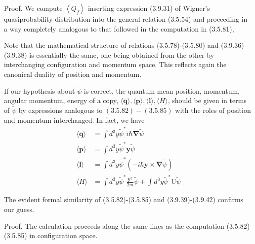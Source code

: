 \documentclass{article}
\begin{document}
Proof. We compute $\left\langle Q_{f}\right\rangle$ inserting expression (3.9.31) of Wigner's quasiprobability distribution into the general relation (3.5.54) and proceeding in a way completely analogous to that followed in the computation in (3.5.81),

Note that the mathematical structure of relations (3.5.78)-(3.5.80) and (3.9.36)(3.9.38) is essentially the same, one being obtained from the other by interchanging configuration and momentum space. This reflects again the canonical duality of position and momentum.

If our hypothesis about $\tilde{\psi}$ is correct, the quantum mean position, momentum, angular momentum, energy of a copy, $\langle\boldsymbol{q}\rangle,\langle\boldsymbol{p}\rangle,\langle\boldsymbol{l}\rangle,\langle H\rangle$, should be given in terms of $\tilde{\psi}$ by expressions analogous to $(3.5 .82)-(3.5 .85)$ with the roles of position and momentum interchanged. In fact, we have
$$
\begin{align*}
\langle\boldsymbol{q}\rangle & =\int d^{3} y \tilde{\psi}^{*} i \hbar \boldsymbol{\nabla} \tilde{\psi}  \tag{3.9.39}\\
\langle\boldsymbol{p}\rangle & =\int d^{3} y \tilde{\psi}^{*} \boldsymbol{y} \tilde{\psi}  \tag{3.9.40}\\
\langle\boldsymbol{l}\rangle & =\int d^{3} y \tilde{\psi}^{*}(-i \hbar \boldsymbol{y} \times \boldsymbol{\nabla} \tilde{\psi})  \tag{3.9.41}\\
\langle H\rangle & =\int d^{3} y \tilde{\psi}^{*} \frac{\boldsymbol{y}^{2}}{2 m} \tilde{\psi}+\int d^{3} y \tilde{\psi}^{*} \mathrm{U} \tilde{\psi} \tag{3.9.42}
\end{align*}
$$

The evident formal similarity of (3.5.82)-(3.5.85) and (3.9.39)-(3.9.42) confirms our guess.

Proof. The calculation proceeds along the same lines as the computation (3.5.82)(3.5.85) in configuration space.
\end{document}

